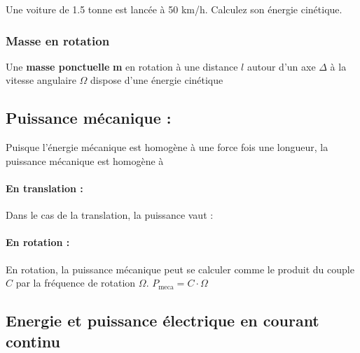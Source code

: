 \documentclass[10pt,fleqn]{article} %
\begin{document}
\begin{exemple}
    Une voiture de 1.5 tonne est lancée à 50 km/h. Calculez son énergie cinétique. 

\afaire {}

\correction{}
\end{exemple}


\subsubsection{Masse en rotation}
\begin{defi}
  Une \textbf{masse ponctuelle} \textbf{m} en rotation à une distance $l$ autour d'un axe $\Delta$ à la vitesse angulaire $\Omega$ dispose d'une énergie cinétique 
\end{defi}


\subsection{Puissance mécanique : }
Puisque l'énergie mécanique est homogène à une force fois une longueur, la puissance mécanique est homogène à 

\begin{defi}
  \paragraph{En translation : } Dans le cas de la translation, la puissance vaut : 
\paragraph{En rotation : }En rotation, la puissance mécanique peut se calculer comme le produit du couple $C$ par la fréquence de rotation $\Omega$. 
$P_{\text{meca}} = C \cdot \Omega$
\end{defi}

\pagebreak
\subsection{Energie et puissance électrique en courant continu}
\end{document}
